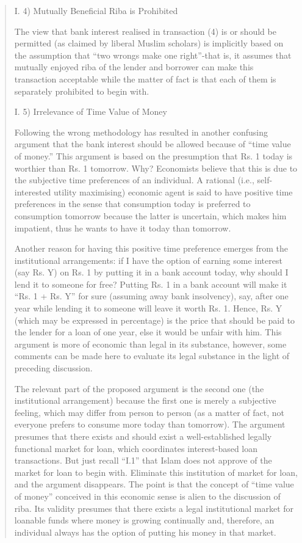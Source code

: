 \begin{quote}
I. 4) Mutually Beneficial Riba is Prohibited

The view that bank interest realised in transaction (4) is or should be permitted (as claimed by liberal Muslim scholars) is implicitly based on the assumption that “two wrongs make one right”-that is, it assumes that mutually enjoyed riba of the lender and borrower can make this transaction acceptable while the matter of fact is that each of them is separately prohibited to begin with.

I. 5) Irrelevance of Time Value of Money

Following the wrong methodology has resulted in another confusing argument that the bank interest should be allowed because of “time value of money.” This argument is based on the presumption that Rs. 1 today is worthier than Rs. 1 tomorrow. Why? Economists believe that this is due to the subjective time preferences of an individual. A rational (i.e., self-interested utility maximising) economic agent is said to have positive time preferences in the sense that consumption today is preferred to consumption tomorrow because the latter is uncertain, which makes him impatient, thus he wants to have it today than tomorrow.

Another reason for having this positive time preference emerges from the institutional arrangements: if I have the option of earning some interest (say Rs. Y) on Rs. 1 by putting it in a bank account today, why should I lend it to someone for free? Putting Rs. 1 in a bank account will make it “Rs. 1 + Rs. Y” for sure (assuming away bank insolvency), say, after one year while lending it to someone will leave it worth Rs. 1. Hence, Rs. Y (which may be expressed in percentage) is the price that should be paid to the lender for a loan of one year, else it would be unfair with him. This argument is more of economic than legal in its substance, however, some comments can be made here to evaluate its legal substance in the light of preceding discussion.

The relevant part of the proposed argument is the second one (the institutional arrangement) because the first one is merely a subjective feeling, which may differ from person to person (as a matter of fact, not everyone prefers to consume more today than tomorrow). The argument presumes that there exists and should exist a well-established legally functional market for loan, which coordinates interest-based loan transactions. But just recall “I.1” that Islam does not approve of the market for loan to begin with. Eliminate this institution of market for loan, and the argument disappears. The point is that the concept of “time value of money” conceived in this economic sense is alien to the discussion of riba. Its validity presumes that there exists a legal institutional market for loanable funds where money is growing continually and, therefore, an individual always has the option of putting his money in that market.


\end{quote}
